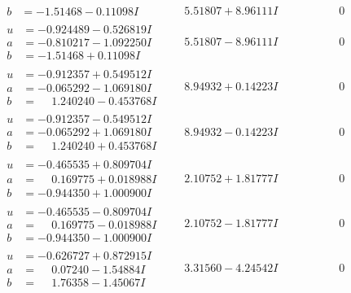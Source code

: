 \documentclass[1p]{elsarticle_modified}
\theoremstyle{definition}
\begin{document}
$$\begin{array}{c|c|c}
\begin{aligned}
b &= -1.51468 - 0.11098 I\end{aligned}
 & \phantom{-}5.51807 + 8.96111 I & \phantom{-0.000000 } 0 \\ \hline\begin{aligned}
u &= -0.924489 - 0.526819 I \\
a &= -0.810217 - 1.092250 I \\
b &= -1.51468 + 0.11098 I\end{aligned}
 & \phantom{-}5.51807 - 8.96111 I & \phantom{-0.000000 } 0 \\ \hline\begin{aligned}
u &= -0.912357 + 0.549512 I \\
a &= -0.065292 - 1.069180 I \\
b &= \phantom{-}1.240240 - 0.453768 I\end{aligned}
 & \phantom{-}8.94932 + 0.14223 I & \phantom{-0.000000 } 0 \\ \hline\begin{aligned}
u &= -0.912357 - 0.549512 I \\
a &= -0.065292 + 1.069180 I \\
b &= \phantom{-}1.240240 + 0.453768 I\end{aligned}
 & \phantom{-}8.94932 - 0.14223 I & \phantom{-0.000000 } 0 \\ \hline\begin{aligned}
u &= -0.465535 + 0.809704 I \\
a &= \phantom{-}0.169775 + 0.018988 I \\
b &= -0.944350 + 1.000900 I\end{aligned}
 & \phantom{-}2.10752 + 1.81777 I & \phantom{-0.000000 } 0 \\ \hline\begin{aligned}
u &= -0.465535 - 0.809704 I \\
a &= \phantom{-}0.169775 - 0.018988 I \\
b &= -0.944350 - 1.000900 I\end{aligned}
 & \phantom{-}2.10752 - 1.81777 I & \phantom{-0.000000 } 0 \\ \hline\begin{aligned}
u &= -0.626727 + 0.872915 I \\
a &= \phantom{-}0.07240 - 1.54884 I \\
b &= \phantom{-}1.76358 - 1.45067 I\end{aligned}
 & \phantom{-}3.31560 - 4.24542 I & \phantom{-0.000000 } 0 \\ \hline\begin{aligned}

\end{aligned}
\end{array}$$
\end{document}

